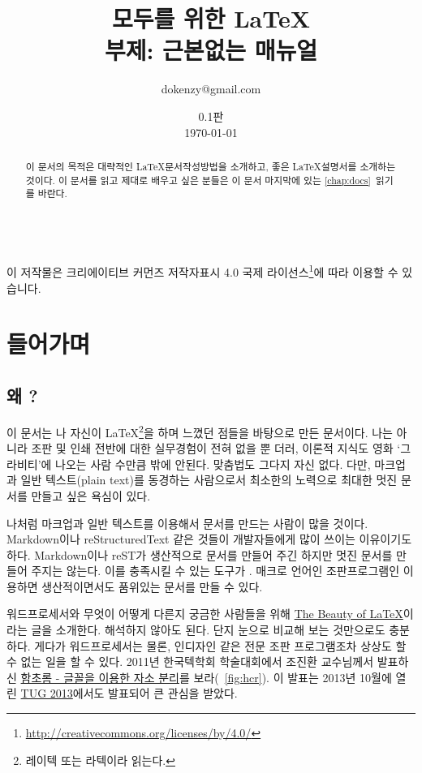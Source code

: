 \documentclass[oneside, chapter, 11pt]{oblivoir}
\title{모두를 위한 \LaTeX\\\small{부제: 근본없는 매뉴얼}}
\author{dokenzy@gmail.com}
\date{0.1판\\\today}
\begin{document}
\maketitle
\begin{abstract}
이 문서의 목적은 대략적인 \LaTeX 문서작성방법을 소개하고, 좋은 \LaTeX 설명서를 소개하는 것이다. 이 문서를 읽고  제대로 배우고 싶은 분들은 이 문서 마지막에 있는 \ref{chap:docs}\chaptername~\을 읽기를 바란다.
\end{abstract}

\begin{center}
\ccbyncsa\\
{\scriptsize 이 저작물은 크리에이티브 커먼즈 저작자표시 4.0 국제 라이선스\footnote{\href{http://creativecommons.org/licenses/by/4.0/}{http://creativecommons.org/licenses/by/4.0/}}에 따라 이용할 수 있습니다.}
\end{center}
\clearpage
\tableofcontents

\frontmatter
\chapter{들어가며}
\section{왜 ?}
이 문서는 나 자신이 \LaTeX\footnote{레이텍 또는 라텍이라 읽는다.}을 하며 느꼈던 점들을 바탕으로 만든  문서이다. 나는  아니라 조판 및 인쇄 전반에 대한 실무경험이 전혀 없을 뿐 더러, 이론적 지식도 영화 `그라비티'에 나오는 사람 수만큼 밖에 안된다. 맞춤법도 그다지 자신 없다. 다만, 마크업과 일반 텍스트(plain text)를 동경하는 사람으로서 최소한의 노력으로 최대한 멋진 문서를 만들고 싶은 욕심이 있다. 

나처럼 마크업과 일반 텍스트를 이용해서 문서를 만드는 사람이 많을 것이다. Markdown이나 reStructuredText 같은 것들이 개발자들에게 많이 쓰이는 이유이기도 하다. Markdown이나 reST가 생산적으로 문서를 만들어 주긴 하지만 멋진 문서를 만들어 주지는 않는다. 이를 충족시킬 수 있는 도구가 . 매크로 언어인  조판프로그램인  이용하면 생산적이면서도 품위있는 문서를 만들 수 있다. 

워드프로세서와 무엇이 어떻게 다른지 궁금한 사람들을 위해 \href{http://nitens.org/taraborelli/latex}{The Beauty of \LaTeX}이라는 글을 소개한다. 해석하지 않아도 된다. 단지 눈으로 비교해 보는 것만으로도 충분하다. 게다가 워드프로세서는 물론, 인디자인 같은 전문 조판 프로그램조차 상상도 할 수 없는 일을 할 수 있다. 2011년 한국텍학회 학술대회에서 조진환 교수님께서 발표하신 \href{http://conf.ktug.org/2011/Program_files/KTS2011-chof.pdf}{함초롬 - 글꼴을 이용한 자소 분리}를 보라(\figurename~\ref{fig:hcr}). 이 발표는 2013년 10월에 열린 \href{http://tug.org/tug2013/}{TUG 2013}에서도 발표되어 큰 관심을 받았다.
\end{document}
